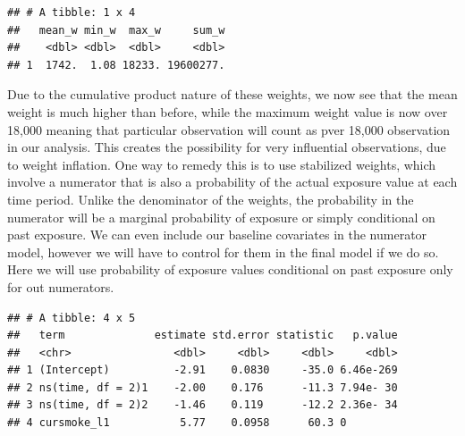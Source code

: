 \documentclass[
]{book}
\newenvironment{Shaded}{\begin{snugshade}}{\end{snugshade}}
\newcommand{\DataTypeTok}[1]{\textcolor[rgb]{0.13,0.29,0.53}{#1}}
\newcommand{\DecValTok}[1]{\textcolor[rgb]{0.00,0.00,0.81}{#1}}
\newcommand{\KeywordTok}[1]{\textcolor[rgb]{0.13,0.29,0.53}{\textbf{#1}}}
\newcommand{\NormalTok}[1]{#1}
\newcommand{\OperatorTok}[1]{\textcolor[rgb]{0.81,0.36,0.00}{\textbf{#1}}}
\newcommand{\StringTok}[1]{\textcolor[rgb]{0.31,0.60,0.02}{#1}}
\begin{document}
\begin{verbatim}
## # A tibble: 1 x 4
##   mean_w min_w  max_w     sum_w
##    <dbl> <dbl>  <dbl>     <dbl>
## 1  1742.  1.08 18233. 19600277.
\end{verbatim}

Due to the cumulative product nature of these weights, we now see that the mean weight is much higher than before, while the maximum weight value is now over 18,000 meaning that particular observation will count as pver 18,000 observation in our analysis. This creates the possibility for very influential observations, due to weight inflation. One way to remedy this is to use stabilized weights, which involve a numerator that is also a probability of the actual exposure value at each time period. Unlike the denominator of the weights, the probability in the numerator will be a marginal probability of exposure or simply conditional on past exposure. We can even include our baseline covariates in the numerator model, however we will have to control for them in the final model if we do so. Here we will use probability of exposure values conditional on past exposure only for out numerators.

\begin{Shaded}
\end{Shaded}

\begin{verbatim}
## # A tibble: 4 x 5
##   term              estimate std.error statistic   p.value
##   <chr>                <dbl>     <dbl>     <dbl>     <dbl>
## 1 (Intercept)          -2.91    0.0830     -35.0 6.46e-269
## 2 ns(time, df = 2)1    -2.00    0.176      -11.3 7.94e- 30
## 3 ns(time, df = 2)2    -1.46    0.119      -12.2 2.36e- 34
## 4 cursmoke_l1           5.77    0.0958      60.3 0
\end{verbatim}
\end{document}
